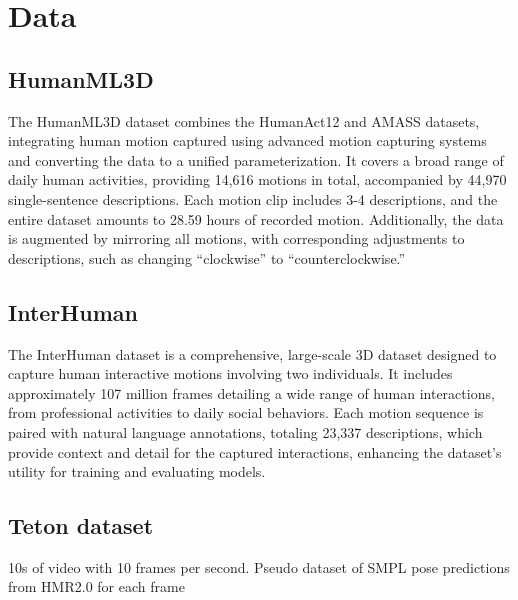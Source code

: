 \chapter{Data}
\section{HumanML3D}
The HumanML3D dataset combines the HumanAct12 and AMASS datasets, integrating human motion captured using advanced motion capturing systems and converting the data to a unified parameterization. It covers a broad range of daily human activities, providing 14,616 motions in total, accompanied by 44,970 single-sentence descriptions. Each motion clip includes 3-4 descriptions, and the entire dataset amounts to 28.59 hours of recorded motion. Additionally, the data is augmented by mirroring all motions, with corresponding adjustments to descriptions, such as changing “clockwise” to “counterclockwise.”


\section{InterHuman}
The InterHuman dataset is a comprehensive, large-scale 3D dataset designed to capture human interactive motions involving two individuals. It includes approximately 107 million frames detailing a wide range of human interactions, from professional activities to daily social behaviors. Each motion sequence is paired with natural language annotations, totaling 23,337 descriptions, which provide context and detail for the captured interactions, enhancing the dataset’s utility for training and evaluating models.

\section{Teton dataset}
10s of video with 10 frames per second.
Pseudo dataset of SMPL pose predictions from HMR2.0 for each frame

